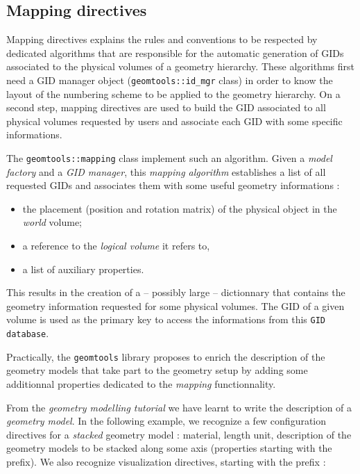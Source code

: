  

\subsection{Mapping directives}

Mapping directives explains the  rules and conventions to be respected
by  dedicated  algorithms  that  are  responsible  for  the  automatic
generation of  GIDs associated to  the physical volumes of  a geometry
hierarchy.   These   algorithms  first  need  a   GID  manager  object
(\texttt{geomtools::id\_mgr} class) in order to know the layout of the
numbering scheme to be applied to the geometry hierarchy.  On a second
step, mapping directives  are used to build the  GID associated to all
physical volumes requested  by users and associate each  GID with some
specific informations.

The  \texttt{geomtools::mapping} class  implement  such an  algorithm.
Given  a   \emph{model  factory}   and  a  \emph{GID   manager},  this
\emph{mapping algorithm} establishes a  list of all requested GIDs and
associates them with some useful geometry informations :

\begin{itemize}

\item  the placement (position  and rotation  matrix) of  the physical
  object in the \emph{world} volume;

\item a reference to the \emph{logical volume} it refers to,

\item a list of auxiliary properties.

\end{itemize}
This results  in the  creation of a  -- possibly large  -- dictionnary
that  contains the  geometry information  requested for  some physical
volumes.  The  GID of  a given volume  is used  as the primary  key to
access the informations from this \texttt{GID database}.


Practically,  the \texttt{geomtools}  library proposes  to  enrich the
description  of the  geometry models  that take  part to  the geometry
setup  by   adding  some  additionnal  properties   dedicated  to  the
\emph{mapping} functionnality.

From the  \emph{geometry modelling tutorial}  we have learnt  to write
the description of a \emph{geometry model}.  In the following example,
we  recognize  a few  configuration  directives  for a  \emph{stacked}
geometry model  : material, length  unit, description of  the geometry
models to  be stacked  along some axis  (properties starting  with the
  prefix).   We also recognize  visualization directives,
starting with the   prefix :

